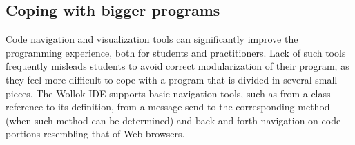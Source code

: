 %
%
%
%

\subsection{Coping with bigger programs}
Code navigation and visualization tools can significantly improve the programming experience, 
both for students and practitioners.
Lack of such tools frequently misleads students to avoid correct modularization of their program, 
as they feel more difficult to cope with a program that is divided in several small pieces.
The Wollok IDE supports basic navigation tools, such as 
from a class reference to its definition, 
from a message send to the corresponding method (when such method can be determined) 
and back-and-forth navigation on code portions resembling that of Web browsers.

